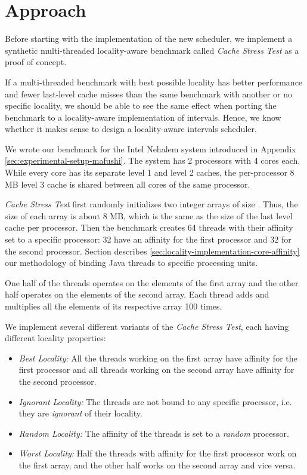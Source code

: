 
\chapter{Approach}
\label{chap:locality-approach}

Before starting with the implementation of the new scheduler, we
implement a synthetic multi-threaded locality-aware benchmark called
\emph{Cache Stress Test} as a proof of concept.

If a multi-threaded benchmark with best possible locality has better
performance and fewer last-level cache misses than the same benchmark
with another or no specific locality, we should be able to see the
same effect when porting the benchmark to a locality-aware
implementation of intervals. Hence, we know whether it makes sense to
design a locality-aware intervals scheduler.

We wrote our benchmark for the Intel Nehalem system introduced in
Appendix \ref{sec:experimental-setup-mafushi}. The system has 2
processors with 4 cores each. While every core has its separate level
1 and level 2 caches, the per-processor 8 MB level 3 cache is shared
between all cores of the same processor.

\emph{Cache Stress Test} first randomly initializes two integer arrays
of size . Thus, the size of each array is about 8
MB, which is the same as the size of the last level cache per
processor. Then the benchmark creates 64 threads with their affinity
set to a specific processor: 32 have an affinity for the first
processor and 32 for the second processor. Section describes
\ref{sec:locality-implementation-core-affinity} our methodology of
binding Java threads to specific processing units.

One half of the threads operates on the elements of the first array
and the other half operates on the elements of the second array. Each
thread adds and multiplies all the elements of its respective array
100 times.

We implement several different variants of the \emph{Cache Stress
  Test}, each having different locality properties:

\begin{itemize}
\item \emph{Best Locality:} All the threads working on the first array
  have affinity for the first processor and all threads working on the
  second array have affinity for the second processor.
\item \emph{Ignorant Locality:} The threads are not bound to any
  specific processor, i.e. they are \emph{ignorant} of their locality.
\item \emph{Random Locality:} The affinity of the threads is set to a
  \emph{random} processor.
\item \emph{Worst Locality:} Half the threads with affinity for the
  first processor work on the first array, and the other half works on
  the second array and vice versa.
\end{itemize}

